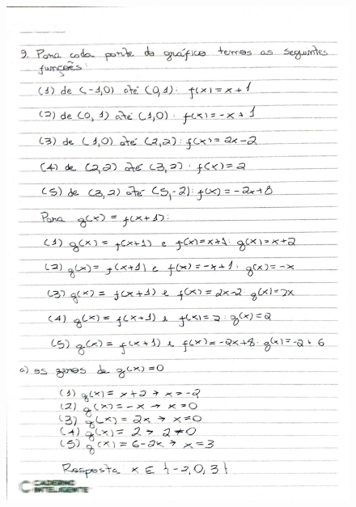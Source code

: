 \documentclass[
  12pt,     %
  openright,      %
  oneside,      %
  a4paper     %
  ]{abntex2}
\begin{document}
\begin{figure}[H]
  \centering
  \includegraphics[scale=0.23]{pagina16.jpg}
\end{figure}
\end{document}
